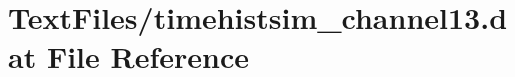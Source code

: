 \hypertarget{TextFiles_2timehistsim__channel13_8dat}{}\section{Text\+Files/timehistsim\+\_\+channel13.dat File Reference}
\label{TextFiles_2timehistsim__channel13_8dat}
